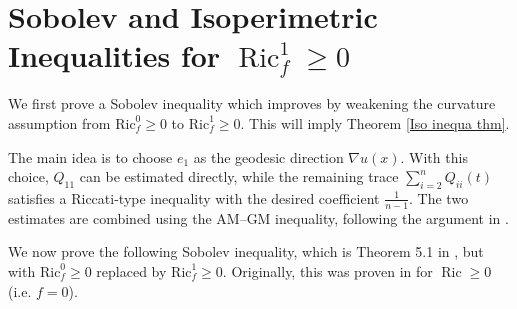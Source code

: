 \documentclass[psamsfonts]{amsart}
\theoremstyle{definition}
\theoremstyle{remark}
\DeclareMathOperator{\Ric}{Ric}
\numberwithin{equation}{section}
\begin{document}
\section{Sobolev and Isoperimetric Inequalities for $\Ric_f^1 \ge 0$}
\label{Section-Sol-Iso}
We first prove a Sobolev inequality which improves \cite[Theorem~5.1]{Fujitani26} by
weakening the curvature assumption from $\mathrm{Ric}_f^0 \geq 0$ to
$\mathrm{Ric}_f^1 \geq 0$. This will imply Theorem \ref{Iso inequa thm}. 

The main idea is to choose $e_1$ as the geodesic direction $\nabla u(x)$.
With this choice, $Q_{11}$ can be estimated directly, while the remaining
trace $\sum_{i=2}^{n}Q_{ii}(t)$ 
satisfies a Riccati-type inequality with the desired coefficient $\frac{1}{n-1}$.
The two estimates are combined using the AM--GM inequality,
following the argument in \cite[Page~10]{chong2025sobolev}.

We now prove the following Sobolev inequality, which is Theorem 5.1 in \cite{Fujitani26}, but with $\mathrm{Ric}_f^0 \geq 0$ replaced by
$\mathrm{Ric}_f^1 \geq 0$. Originally, this was proven in \cite{Brendle2023} for $\Ric \ge 0$ (i.e. $f =0$). 
\end{document}

